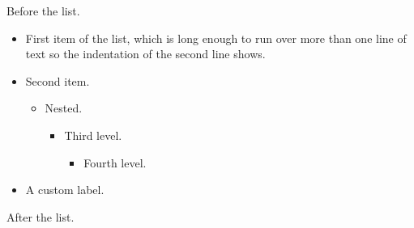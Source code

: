 \documentclass{article}
\begin{document}
Before the list.
\begin{itemize}
\item First item of the list, which is long enough to run over more than one line of text so
the indentation of the second line shows.
\item Second item.
\begin{itemize}
\item Nested.
\begin{itemize}
\item Third level.
\begin{itemize}
\item Fourth level.
\end{itemize}
\end{itemize}
\end{itemize}
\item[$\star$] A custom label.
\end{itemize}
After the list.
\end{document}
